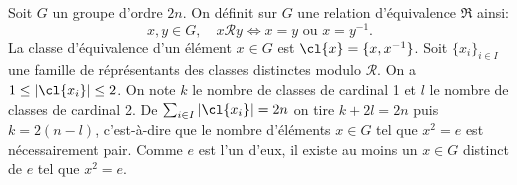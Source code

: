Soit $G$ un groupe d'ordre $2n$. On définit sur $G$ une relation d'équivalence
$\mathfrak{R}$ ainsi:
\[
  x,y\in G,\quad x \mathcal{R} y \Leftrightarrow x = y \text{ ou } x = y^{-1}.
\]
La classe d'équivalence d'un élément $x\in G$ est $\cl{x} = \{ x, x^{-1} \}$.
Soit $\{ x_i \}_{i\in I}$ une famille de réprésentants des classes distinctes
modulo $\mathcal{R}$.  On a $1 \leq |\cl{x_i}| \leq 2$. On note $k$ le nombre
de classes de cardinal 1 et $l$ le nombre de classes de cardinal 2. De
$\sum_{i\in I} |\cl{x_i}| = 2n$ on tire $k+2l = 2n$ puis $k = 2(n-l)$,
c'est-à-dire que le nombre d'éléments $x\in G$ tel que $x^2=e$ est
nécessairement pair. Comme $e$ est l'un d'eux, il existe au moins un $x\in G$
distinct de $e$ tel que $x^2 = e$.


